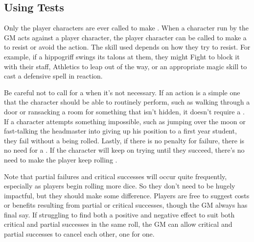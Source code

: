\subsection{Using Tests}

Only the player characters are ever called to make {\tests}.
When a character run by the GM acts against a player character, the player character can be called to make a {\test} to resist or avoid the action.
The skill used depends on how they try to resist.
For example, if a hippogriff swings its talons at them, they might {\test} Fight to block it with their staff, {\test} Athletics to leap out of the way, or {\test} an appropriate magic skill to cast a defensive spell in reaction.

Be careful not to call for a {\test} when it's not necessary.
If an action is a simple one that the character should be able to routinely perform, such as walking through a door or ransacking a room for something that isn't hidden, it doesn't require a {\test}.
If a character attempts something impossible, such as jumping over the moon or fast-talking the headmaster into giving up his position to a first year student, they fail without a {\test} being rolled.
Lastly, if there is no penalty for failure, there is no need for a {\test}.
If the character will keep on trying until they succeed, there's no need to make the player keep rolling {\tests}.

Note that partial failures and critical successes will occur quite frequently, especially as players begin rolling more dice.
So they don't need to be hugely impactful, but they should make some difference.
Players are free to suggest costs or benefits resulting from partial or critical successes, though the GM always has final say.
If struggling to find both a positive and negative effect to suit both critical and partial successes in the same roll, the GM can allow critical and partial successes to cancel each other, one for one.
